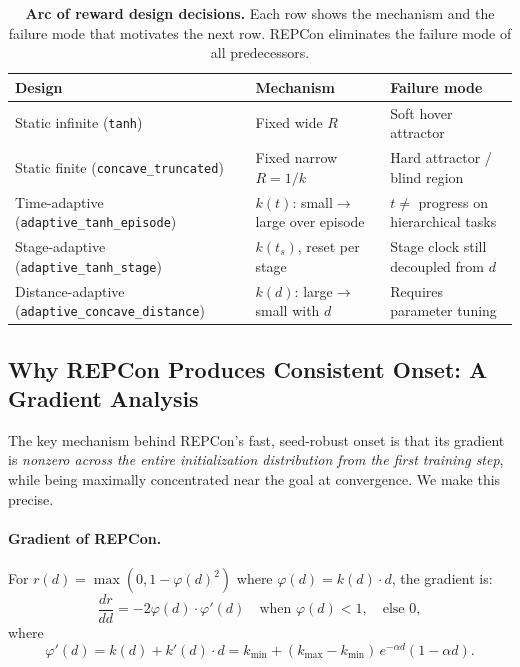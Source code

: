 \documentclass{article}
\begin{document}
\begin{table}[h]
\centering
\small
\caption{\textbf{Arc of reward design decisions.} Each row shows the mechanism and
the failure mode that motivates the next row. REPCon eliminates the failure mode
of all predecessors.}
\label{tab:design-arc}
\begin{tabular}{@{}lll@{}}
\toprule
\textbf{Design} & \textbf{Mechanism} & \textbf{Failure mode} \\
\midrule
Static infinite (\texttt{tanh})            & Fixed wide $R$            & Soft hover attractor \\
Static finite (\texttt{concave\_truncated})& Fixed narrow $R=1/k$      & Hard attractor / blind region \\
Time-adaptive (\texttt{adaptive\_tanh\_episode}) & $k(t)$: small$\to$large over episode & $t \neq$ progress on hierarchical tasks \\
Stage-adaptive (\texttt{adaptive\_tanh\_stage})  & $k(t_s)$, reset per stage & Stage clock still decoupled from $d$ \\
Distance-adaptive (\texttt{adaptive\_concave\_distance}) & $k(d)$: large$\to$small with $d$ & Requires parameter tuning \\
\bottomrule
\end{tabular}
\end{table}

\subsection{Why REPCon Produces Consistent Onset: A Gradient Analysis}
\label{sec:gradient}

The key mechanism behind REPCon's fast, seed-robust onset is that its gradient is
\emph{nonzero across the entire initialization distribution from the first training step},
while being maximally concentrated near the goal at convergence. We make this precise.

\paragraph{Gradient of REPCon.}
For $r(d) = \max(0,1-\varphi(d)^2)$ where $\varphi(d) = k(d)\cdot d$, the gradient is:
\begin{equation}
    \frac{dr}{dd} = -2\varphi(d)\cdot\varphi'(d) \quad \text{when } \varphi(d) < 1,
    \quad \text{else } 0,
    \label{eq:grad}
\end{equation}
where
\begin{equation}
    \varphi'(d) = k(d) + k'(d)\cdot d = k_{\min} + (k_{\max}-k_{\min})\,e^{-\alpha d}(1-\alpha d).
    \label{eq:phiprime}
\end{equation}
\end{document}
